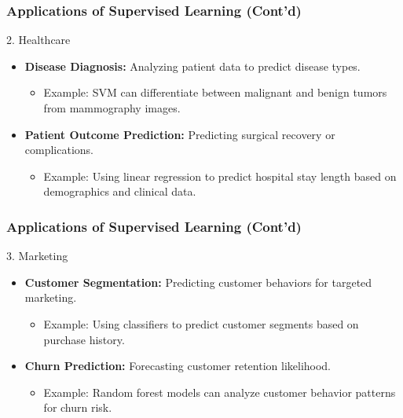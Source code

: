 \documentclass[aspectratio=169]{beamer}
\begin{document}
\begin{frame}[fragile]
    \frametitle{Applications of Supervised Learning (Cont'd)}
    \begin{block}{2. Healthcare}
        \begin{itemize}
            \item \textbf{Disease Diagnosis:} Analyzing patient data to predict disease types.
            \begin{itemize}
                \item Example: SVM can differentiate between malignant and benign tumors from mammography images.
            \end{itemize}
            \item \textbf{Patient Outcome Prediction:} Predicting surgical recovery or complications.
            \begin{itemize}
                \item Example: Using linear regression to predict hospital stay length based on demographics and clinical data.
            \end{itemize}
        \end{itemize}
    \end{block}
\end{frame}

\begin{frame}[fragile]
    \frametitle{Applications of Supervised Learning (Cont'd)}
    \begin{block}{3. Marketing}
        \begin{itemize}
            \item \textbf{Customer Segmentation:} Predicting customer behaviors for targeted marketing.
            \begin{itemize}
                \item Example: Using classifiers to predict customer segments based on purchase history.
            \end{itemize}
            \item \textbf{Churn Prediction:} Forecasting customer retention likelihood.
            \begin{itemize}
                \item Example: Random forest models can analyze customer behavior patterns for churn risk.
            \end{itemize}
        \end{itemize}
    \end{block}
\end{frame}
\end{document}
